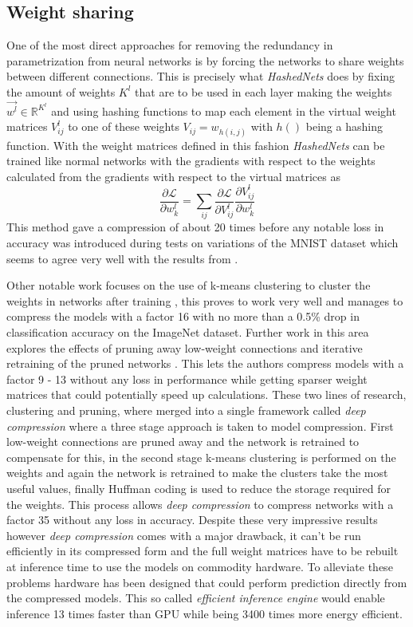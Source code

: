 \documentclass{kththesis}
\newcommand{\bibentry}[1]{\parencite{#1}}
\begin{document}
\subsection{Weight sharing}
One of the most direct approaches for removing the redundancy in parametrization
from neural networks is by forcing the networks to share weights between
different connections. This is precisely what \emph{HashedNets}
\bibentry{chen2015compressing} does by fixing the amount of weights \(K^l\) that
are to be used in each layer making the weights \(\vec{w^l} \in
\mathbb{R}^{K^l}\) and using hashing functions to map each element in the
virtual weight matrices \(V_{ij}^l\) to one of these weights \(V_{ij} =
w_{h(i,j)}\) with \(h()\) being a hashing function. With the weight matrices
defined in this fashion \emph{HashedNets} can be trained like normal networks
with the gradients with respect to the weights calculated from the gradients
with respect to the virtual matrices as  
\[ \frac{\partial\mathcal{L}}{\partial w_k^l} = \sum_{ij} \frac{\partial\mathcal{L}}{\partial V_{ij}^l}\frac{\partial V_{ij}^l}{\partial w_k^l} \]
This method gave a compression of about 20 times before any notable loss in
accuracy was introduced during tests on variations of the MNIST dataset which
seems to agree very well with the results from \bibentry{denil2013predicting}. 

Other notable work focuses on the use of k-means clustering to cluster the
weights in networks after training \bibentry{gong2014compressing}, this proves
to work very well and manages to compress the models with a factor 16 with no
more than a 0.5\% drop in classification accuracy on the ImageNet dataset.
Further work in this area explores the effects of pruning away low-weight
connections and iterative retraining of the pruned networks
\bibentry{han2015learning}. This lets the authors compress models with a factor
9 - 13 without any loss in performance while getting sparser weight matrices
that could potentially speed up calculations. These two lines of research,
clustering and pruning, where merged into a single framework called \emph{deep
  compression} \bibentry{han2015deep} where a three stage approach is taken to
model compression. First low-weight connections are pruned away and the network
is retrained to compensate for this, in the second stage k-means clustering is
performed on the weights and again the network is retrained to make the clusters
take the most useful values, finally Huffman coding
\bibentry{van1976construction} is used to reduce the storage required for the
weights. This process allows \emph{deep compression} to compress networks with a
factor 35 without any loss in accuracy. Despite these very impressive results
however \emph{deep compression} comes with a major drawback, it can't be run
efficiently in its compressed form and the full weight matrices have to be
rebuilt at inference time to use the models on commodity hardware. To alleviate
these problems hardware has been designed that could perform prediction directly
from the compressed models. This so called \emph{efficient inference engine}
\bibentry{han2016eie} would enable inference 13 times faster than GPU while
being 3400 times more energy efficient. 
\end{document}
